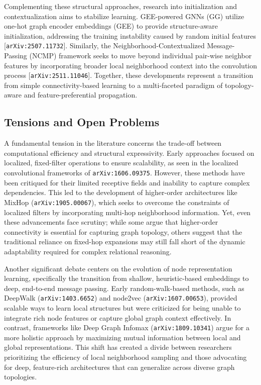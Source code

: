 \documentclass[11pt]{article}
\begin{document}
Complementing these structural approaches, research into initialization and contextualization aims to stabilize learning. GEE-powered GNNs (GG) utilize one-hot graph encoder embeddings (GEE) to provide structure-aware initialization, addressing the training instability caused by random initial features [\texttt{arXiv:2507.11732}]. Similarly, the Neighborhood-Contextualized Message-Passing (NCMP) framework seeks to move beyond individual pair-wise neighbor features by incorporating broader local neighborhood context into the convolution process [\texttt{arXiv:2511.11046}]. Together, these developments represent a transition from simple connectivity-based learning to a multi-faceted paradigm of topology-aware and feature-preferential propagation.

\subsection{Tensions and Open Problems}

A fundamental tension in the literature concerns the trade-off between computational efficiency and structural expressivity. Early approaches focused on localized, fixed-filter operations to ensure scalability, as seen in the localized convolutional frameworks of \texttt{arXiv:1606.09375}. However, these methods have been critiqued for their limited receptive fields and inability to capture complex dependencies. This led to the development of higher-order architectures like MixHop (\texttt{arXiv:1905.00067}), which seeks to overcome the constraints of localized filters by incorporating multi-hop neighborhood information. Yet, even these advancements face scrutiny; while some argue that higher-order connectivity is essential for capturing graph topology, others suggest that the traditional reliance on fixed-hop expansions may still fall short of the dynamic adaptability required for complex relational reasoning.

Another significant debate centers on the evolution of node representation learning, specifically the transition from shallow, heuristic-based embeddings to deep, end-to-end message passing. Early random-walk-based methods, such as DeepWalk (\texttt{arXiv:1403.6652}) and node2vec (\texttt{arXiv:1607.00653}), provided scalable ways to learn local structures but were criticized for being unable to integrate rich node features or capture global graph context effectively. In contrast, frameworks like Deep Graph Infomax (\texttt{arXiv:1809.10341}) argue for a more holistic approach by maximizing mutual information between local and global representations. This shift has created a divide between researchers prioritizing the efficiency of local neighborhood sampling and those advocating for deep, feature-rich architectures that can generalize across diverse graph topologies.
\end{document}
